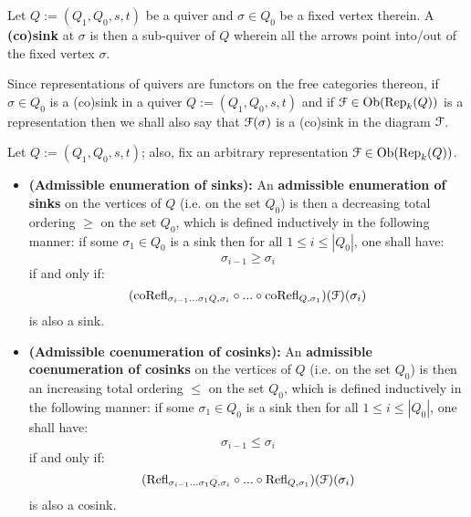             \begin{definition}[(Co)sinks] \label{def: (co)sinks}
                Let $Q := (Q_1, Q_0, s, t)$ be a quiver and $\sigma \in Q_0$ be a fixed vertex therein. A \textbf{(co)sink} at $\sigma$ is then a sub-quiver of $Q$ wherein all the arrows point into/out of the fixed vertex $\sigma$. 
            \end{definition}
            \begin{convention}
                Since representations of quivers are functors on the free categories thereon, if $\sigma \in Q_0$ is a (co)sink in a quiver $Q := (Q_1, Q_0, s, t)$ and if $\mathcal{F} \in \mathrm{Ob}(\mathrm{Rep}_k(Q))$ is a representation then we shall also say that $\mathcal{F}(\sigma)$ is a (co)sink in the diagram $\mathcal{F}$.  
            \end{convention}
            \begin{definition} \label{def: admissible_enumerations_of_(co)sinks}
                Let $Q := (Q_1, Q_0, s, t)$; also, fix an arbitrary representation $\mathcal{F} \in \mathrm{Ob}(\mathrm{Rep}_k(Q))$. 
                    \begin{itemize}
                        \item \textbf{(Admissible enumeration of sinks):} An \textbf{admissible enumeration of sinks} on the vertices of $Q$ (i.e. on the set $Q_0$) is then a decreasing total ordering $\geq$ on the set $Q_0$, which is defined inductively in the following manner: if some $\sigma_1 \in Q_0$ is a sink then for all $1 \leq i \leq |Q_0|$, one shall have:
                            $$\sigma_{i - 1} \geq \sigma_i$$
                        if and only if:
                            $$(\mathrm{co}\mathrm{Refl}_{\sigma_{i - 1} ... \sigma_1 Q, \sigma_i} \circ ... \circ \mathrm{co}\mathrm{Refl}_{Q, \sigma_1})(\mathcal{F})(\sigma_i)$$
                        is also a sink.
                        \item \textbf{(Admissible coenumeration of cosinks):} An \textbf{admissible coenumeration of cosinks} on the vertices of $Q$ (i.e. on the set $Q_0$) is then an increasing total ordering $\leq$ on the set $Q_0$, which is defined inductively in the following manner: if some $\sigma_1 \in Q_0$ is a sink then for all $1 \leq i \leq |Q_0|$, one shall have:
                            $$\sigma_{i - 1} \leq \sigma_i$$
                        if and only if:
                            $$(\mathrm{Refl}_{\sigma_{i - 1} ... \sigma_1 Q, \sigma_i} \circ ... \circ \mathrm{Refl}_{Q, \sigma_1})(\mathcal{F})(\sigma_i)$$
                        is also a cosink.
                    \end{itemize}
            \end{definition}
